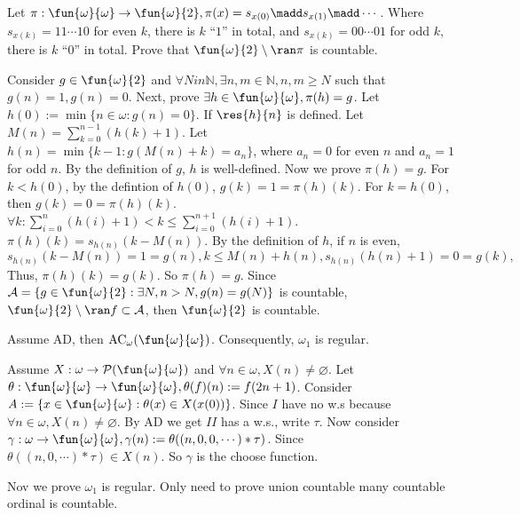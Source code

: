 \documentclass{ctexart}
\begin{document}
\begin{problem}
  Let \(\pi:\fun{\omega}{\omega} \to \fun{\omega}{2},\pi(x)=s_{x(0)}\madd s_{x(1)}\madd\cdots\). 
  Where \(s_{x(k)}=11\cdots10\) for even \(k\), there is \(k\) ``\(1\)'' in total, and \(s_{x(k)}=00\cdots0 1\) for odd \(k\), there is \(k\) ``\(0\)'' in total. 
  Prove that \(\fun{\omega}{2} \setminus \ran \pi\) is countable. 
\end{problem}

\begin{solution}
  Consider \(g \in \fun{\omega}{2}\) and \(\forall N in \mathbb{N}, \exists n,m \in \mathbb{N}, n,m \geq N\) such that 
  \(g(n) = 1, g(n) = 0\). 
  Next, prove \(\exists h \in \fun{ \omega}{\omega},\pi(h)=g\). 
  Let \(h(0):=\min\{n \in \omega:g(n)=0\}\). 
  If \(\res{h}{n}\) is defined. Let \(M(n)=\sum_{k=0}^{n-1} (h(k)+1) \). 
  Let \(h(n)= \min\{k- 1:g(M(n)+k)=a_n\}\), where \(a_n=0\) for even \(n\) and \(a_n=1\) for odd \(n\). 
  By the definition of \(g\), \(h\) is well-defined. Now we prove \(\pi(h)=g\). 
  For \(k<h(0)\), by the defintion of \(h(0)\), \(g(k)=1=\pi(h)(k)\). 
  For \(k=h(0)\), then \(g(k)=0=\pi(h)(k)\). 
  \(\forall k: \sum_{i=0}^{n} (h(i)+1) <k \leq \sum_{i=0}^{n+1} (h(i)+1)\). 
  \(\pi(h)(k)=s_{h(n)}(k-M(n) )\). By the definition of \(h\), if \(n\) is even, 
  \(s_{h(n)}(k-M(n))=1=g(n), k \leq M(n)+h(n), s_{h(n)}(h(n)+1)= 0 = g(k),\)
  Thus, \(\pi(h)(k) = g(k)\). So \(\pi(h)=g\).
  Since \(\mathcal{A} = \{g \in \fun{\omega}{2}: \exists N, n >N , g(n)=g(N)\}\) is countable,
  \(\fun{\omega}{2} \setminus \ran f \subset \mathcal{A}\), then \(\fun{\omega}{2}\) is countable.
\end{solution}

\begin{problem}
  Assume AD, then \(\mathrm{AC}_\omega(\fun{\omega}{\omega}) \). Consequently, \(\omega_1\) is regular. 
\end{problem}

\begin{solution}
  Assume \(X:\omega \to \mathcal{P}(\fun{\omega}{\omega})\) and \(\forall n \in \omega,X(n)\neq \varnothing\). 
  Let \(\theta:\fun{\omega}{\omega}\to \fun{\omega}{\omega},\theta(f)(n):=f(2n+1)\). 
  Consider \(A:=\{x \in \fun{\omega}{\omega}:\theta(x) \in X(x(0))\}\). 
  Since \(I\) have no w.s because \(\forall n \in \omega,X(n)\neq \varnothing\). 
  By AD we get \(II\) has a w.s., write \(\tau\). 
  Now consider \(\gamma:\omega \to \fun{\omega}{\omega},\gamma(n):=\theta((n,0,0,\cdots)*\tau)\). 
  Since \(\theta((n,0,\cdots)*\tau) \in X(n)\). So \(\gamma\) is the choose function. 
  
  Nov we prove \(\omega_1\) is regular. Only need to prove union countable many countable ordinal is countable. 
  
\end{solution}
\fi
\end{document}
